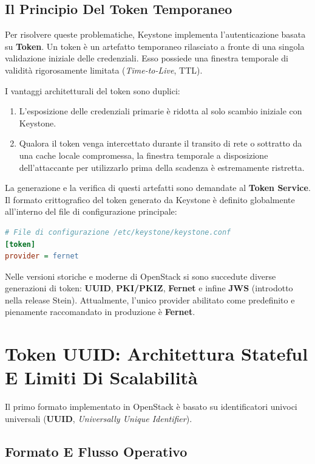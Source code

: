 \documentclass[11pt, a4paper]{article}
\begin{document}
\subsection{Il Principio Del Token Temporaneo}

Per risolvere queste problematiche, Keystone implementa l'autenticazione basata su \textbf{Token}. Un token è un artefatto temporaneo rilasciato a fronte di una singola validazione iniziale delle credenziali. Esso possiede una finestra temporale di validità rigorosamente limitata (\emph{Time-to-Live}, TTL).

I vantaggi architetturali del token sono duplici:
\begin{enumerate}
    \item L'esposizione delle credenziali primarie è ridotta al solo scambio iniziale con Keystone.
    \item Qualora il token venga intercettato durante il transito di rete o sottratto da una cache locale compromessa, la finestra temporale a disposizione dell'attaccante per utilizzarlo prima della scadenza è estremamente ristretta.
\end{enumerate}

La generazione e la verifica di questi artefatti sono demandate al \textbf{Token Service}. Il formato crittografico del token generato da Keystone è definito globalmente all'interno del file di configurazione principale:

\begin{lstlisting}[language=ini]
# File di configurazione /etc/keystone/keystone.conf
[token]
provider = fernet
\end{lstlisting}

Nelle versioni storiche e moderne di OpenStack si sono succedute diverse generazioni di token: \textbf{UUID}, \textbf{PKI/PKIZ}, \textbf{Fernet} e infine \textbf{JWS} (introdotto nella release Stein). Attualmente, l'unico provider abilitato come predefinito e pienamente raccomandato in produzione è \textbf{Fernet}.

\newpage

\section{Token UUID: Architettura Stateful E Limiti Di Scalabilità}

Il primo formato implementato in OpenStack è basato su identificatori univoci universali (\textbf{UUID}, \emph{Universally Unique Identifier}).

\subsection{Formato E Flusso Operativo}
\end{document}
